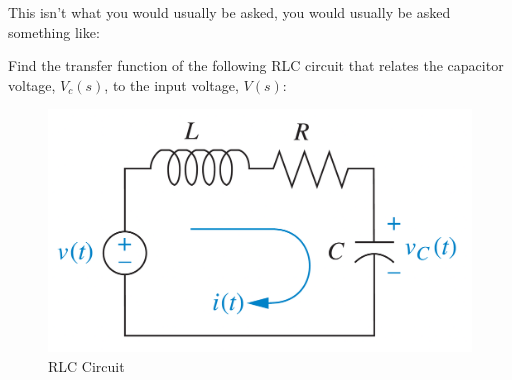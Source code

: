 \documentclass{article}
\theoremstyle{mytheoremstyle}
\theoremstyle{mytheoremstyle}
\theoremstyle{myproblemstyle}
\theoremstyle{break}
\begin{document}
This isn't what you would usually be asked, you would usually be asked something like:
\begin{problem}
Find the transfer function of the following RLC circuit that relates the capacitor voltage, $V_c(s)$, to the input voltage, $V(s)$:
\begin{figure}[H]
	\includegraphics[scale=0.1]{Simple RLC Circuit}
	\centering
	\caption{RLC Circuit}
\end{figure}
\end{problem}
\end{document}
